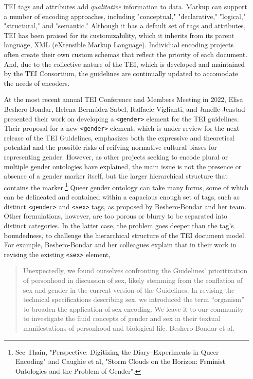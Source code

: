 \documentclass[11pt]{article}
\begin{document}
TEI tags and attributes add \emph{qualitative} information to data. Markup
can support a number of encoding approaches, including "conceptual,"
"declarative," "logical," "structural," and "semantic." Although it
has a default set of tags and attributes, TEI has been praised for its
customizability, which it inherits from its parent language, XML
(eXtensible Markup Language). Individual encoding projects often
create their own custom schemas that reflect the priority of each
document. And, due to the collective nature of the TEI, which is
developed and maintained by the TEI Consortium, the guidelines are
continually updated to accomodate the needs of encoders. 

At the most recent annual TEI Conference and Members Meeting in 2022,
Elisa Beshero-Bondar, Helena Bermúdez Sabel, Raffaele Viglianti, and
Janelle Jenstad presented their work on developing a \texttt{<gender>}
element for the TEI guidelines. Their proposal for a new \texttt{<gender>}
element, which is under review for the next release of the TEI
Guidelines, emphasizes both the expressive and theoretical potential
and the possible risks of reifying normative cultural biases for
representing gender. However, as other projects seeking to encode
plural or multiple gender ontologies have explained, the main issue is
not the presence or absence of a gender marker itself, but the larger
hierarchical structure that contains the marker.\footnote{See Thain, "Perspective: Digitizing the Diary--Experiments in
Queer Encoding" and Caughie et al, "Storm Clouds on the Horizon:
Feminist Ontologies and the Problem of Gender".} Queer gender
ontology can take many forms, some of which can be delineated and
contained within a capacious enough set of tags, such as distinct
\texttt{<gender>} and \texttt{<sex>} tags, as proposed by Beshero-Bondar and her
team. Other formulations, however, are too porous or blurry to be
separated into distinct categories. In the latter case, the problem
goes deeper than the tag's boundedness, to challenge the hierarchical
structure of the TEI document model. For example, Beshero-Bondar and
her colleagues explain that in their work in revising the existing
\texttt{<sex>} element,
\begin{quote}
Unexpectedly, we found ourselves confronting the Guidelines’
prioritization of personhood in discussion of sex, likely stemming
from the conflation of sex and gender in the current version of the
Guidelines. In revising the technical specifications describing sex,
we introduced the term “organism” to broaden the application of sex
encoding. We leave it to our community to investigate the fluid
concepts of gender and sex in their textual manifestations of
personhood and biological life. Beshero-Bondar et al.
\end{quote}
\end{document}

